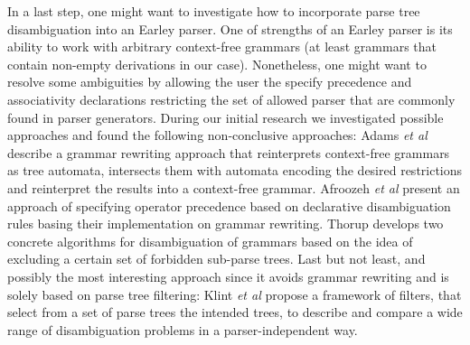 \begin{isabellebody}
\begin{isamarkuptext}
In a last step, one might want to investigate how to incorporate parse tree disambiguation into an
Earley parser. One of strengths of an Earley parser is its ability to work with arbitrary context-free
grammars (at least grammars that contain non-empty derivations in our case). Nonetheless, one might
want to resolve some ambiguities by allowing the user the specify precedence and associativity declarations
restricting the set of allowed parser that are commonly found in parser generators. During our initial
research we investigated possible approaches and found the following non-conclusive approaches:
Adams \textit{et al} \cite{Adams:2017} describe a grammar rewriting approach that reinterprets context-free
grammars as tree automata, intersects them with automata encoding the desired restrictions and reinterpret
the results into a context-free grammar. Afroozeh \textit{et al} \cite{Afroozeh:2013} present an approach
of specifying operator precedence based on declarative disambiguation rules basing their implementation
on grammar rewriting. Thorup \cite{Thorup:1996} develops two concrete algorithms for disambiguation of
grammars based on the idea of excluding a certain set of forbidden sub-parse trees. Last but not least,
and possibly the most interesting approach since it avoids grammar rewriting and is solely based on parse
tree filtering: Klint \textit{et al} \cite{Klint:1997} propose a framework of filters, that select from
a set of parse trees the intended trees, to describe and compare a wide range of disambiguation problems
in a parser-independent way.%
\end{isamarkuptext}\isamarkuptrue%
%
\isadelimtheory
%
\endisadelimtheory
%
\isatagtheory
%
\endisatagtheory
{\isafoldtheory}%
%
\isadelimtheory
%
\endisadelimtheory
%
\end{isabellebody}%
\endinput
